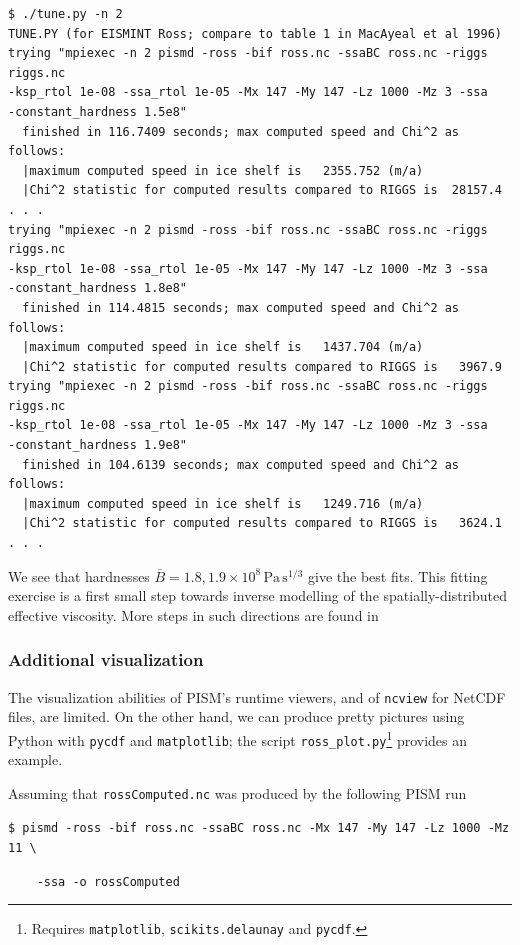 \documentclass[11pt,final]{amsart}
\renewcommand{\t}[1]{\texttt{#1}}
\begin{document}
\small\begin{verbatim}
$ ./tune.py -n 2
TUNE.PY (for EISMINT Ross; compare to table 1 in MacAyeal et al 1996)
trying "mpiexec -n 2 pismd -ross -bif ross.nc -ssaBC ross.nc -riggs riggs.nc
-ksp_rtol 1e-08 -ssa_rtol 1e-05 -Mx 147 -My 147 -Lz 1000 -Mz 3 -ssa
-constant_hardness 1.5e8"
  finished in 116.7409 seconds; max computed speed and Chi^2 as follows:
  |maximum computed speed in ice shelf is   2355.752 (m/a)
  |Chi^2 statistic for computed results compared to RIGGS is  28157.4
. . .
trying "mpiexec -n 2 pismd -ross -bif ross.nc -ssaBC ross.nc -riggs riggs.nc
-ksp_rtol 1e-08 -ssa_rtol 1e-05 -Mx 147 -My 147 -Lz 1000 -Mz 3 -ssa
-constant_hardness 1.8e8"
  finished in 114.4815 seconds; max computed speed and Chi^2 as follows:
  |maximum computed speed in ice shelf is   1437.704 (m/a)
  |Chi^2 statistic for computed results compared to RIGGS is   3967.9
trying "mpiexec -n 2 pismd -ross -bif ross.nc -ssaBC ross.nc -riggs riggs.nc
-ksp_rtol 1e-08 -ssa_rtol 1e-05 -Mx 147 -My 147 -Lz 1000 -Mz 3 -ssa
-constant_hardness 1.9e8"
  finished in 104.6139 seconds; max computed speed and Chi^2 as follows:
  |maximum computed speed in ice shelf is   1249.716 (m/a)
  |Chi^2 statistic for computed results compared to RIGGS is   3624.1
. . .
\end{verbatim}
\normalsize

We see that hardnesses $\bar B = 1.8,1.9 \times 10^8 \, \text{Pa}\, \text{s}^{1/3}$ give the best fits.  This fitting exercise is a first small step towards inverse modelling of the spatially-distributed effective viscosity.  More steps in such directions are found in \cite{HumbertGreveHutter,RommelaereMacAyeal}


\subsubsection*{Additional visualization}  The visualization abilities of PISM's runtime viewers, and of \verb|ncview| for NetCDF files, are limited.  On the other hand, we can produce pretty pictures using Python with \verb|pycdf| and \verb|matplotlib|; the script \verb|ross_plot.py|\footnote{Requires \t{matplotlib}, \t{scikits.delaunay} and \t{pycdf}.} provides an example.

Assuming that \verb|rossComputed.nc| was produced by the following PISM run

\verb|$ pismd -ross -bif ross.nc -ssaBC ross.nc -Mx 147 -My 147 -Lz 1000 -Mz 11 \|

\verb|    -ssa -o rossComputed|
\end{document}
